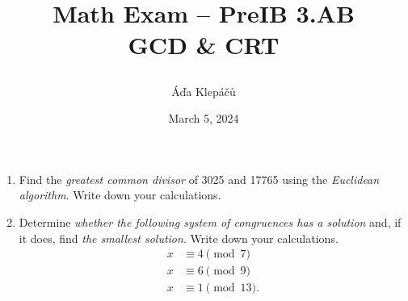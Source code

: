 \documentclass[a4paper,11pt]{article}
\title{\Huge\textsf{Math Exam -- PreIB 3.AB}\\
 \Large\textsf{GCD \& CRT}
 \author{Áďa Klepáčů}
 \date{March 5, 2024}
}
\begin{document}
\maketitle
\thispagestyle{fancy}

\begin{enumerate}
 \item Find the \emph{greatest common divisor} of 3025 and 17765 using the
  \emph{Euclidean algorithm}. Write down your calculations.
 \item Determine \emph{whether the following system of congruences has a
  solution} and, if it does, find \emph{the smallest solution}. Write down your
  calculations.
  \begin{align*}
   x & \equiv 4 \pmod{7}\\
   x & \equiv 6 \pmod{9}\\
   x & \equiv 1 \pmod{13}.
  \end{align*}
\end{enumerate}

\begin{center}

 
\end{center}
\end{document}

